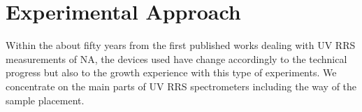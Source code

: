\section{Experimental Approach}

Within the about fifty years from the first published works dealing with UV RRS
measurements of NA, the devices used have change accordingly to the technical
progress but also to the growth experience with this type of experiments.
We concentrate on the main parts of UV RRS spectrometers including the way of
the sample placement.








